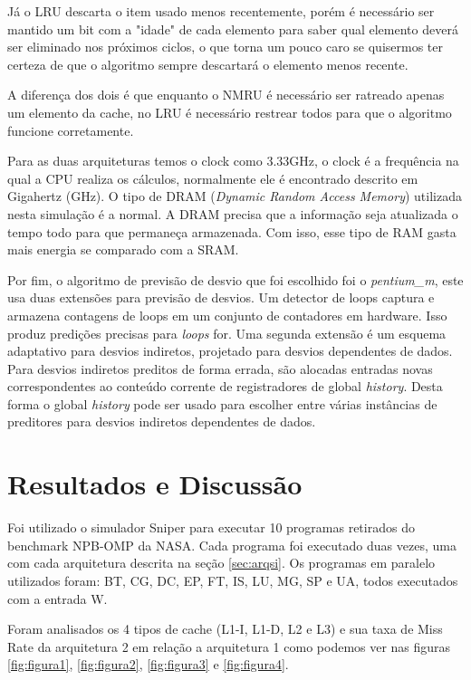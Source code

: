 \documentclass[12pt]{article}
\begin{document}
Já o LRU descarta o item usado menos recentemente, porém é necessário ser mantido um bit com a "idade" de cada elemento para saber qual elemento deverá ser eliminado nos próximos ciclos, o que torna um pouco caro se quisermos ter certeza de que o algoritmo sempre descartará o elemento menos recente.

A diferença dos dois é que enquanto o NMRU é necessário ser ratreado apenas um elemento da cache, no LRU é necessário restrear todos para que o algoritmo funcione corretamente. 

Para as duas arquiteturas temos o clock como 3.33GHz, o clock é a frequência na qual a CPU realiza os cálculos, normalmente ele é encontrado descrito em Gigahertz (GHz). O tipo de DRAM (\textit{Dynamic Random Access Memory}) utilizada nesta simulação é a normal. A DRAM precisa que a informação seja atualizada o tempo todo para que permaneça armazenada. Com isso, esse tipo de RAM gasta mais energia se comparado com a SRAM. 

Por fim, o algoritmo de previsão de desvio que foi escolhido foi o \textit{pentium\_m}, este usa duas extensões para previsão de desvios. Um detector de loops captura e armazena contagens de loops em um conjunto de contadores em hardware. Isso produz predições precisas para \textit{loops} for. Uma segunda extensão é um esquema adaptativo para desvios indiretos, projetado para desvios dependentes de dados. Para desvios indiretos preditos de forma errada, são alocadas entradas novas correspondentes ao conteúdo corrente de registradores de global \textit{history}. Desta forma o global \textit{history} pode ser usado para escolher entre várias instâncias de preditores para desvios indiretos dependentes de dados. \cite{gui}

\section{Resultados e Discussão} \label{sec:result}
Foi utilizado o simulador Sniper para executar 10 programas retirados do benchmark NPB-OMP da NASA. Cada programa foi executado duas vezes, uma com cada arquitetura descrita na seção \ref{sec:arqsi}. Os programas em paralelo utilizados foram:  BT, CG, DC, EP, FT, IS, LU, MG, SP e UA, todos executados com a entrada W.

Foram analisados os 4 tipos de cache (L1-I, L1-D, L2 e L3) e sua taxa de Miss Rate da arquitetura 2 em relação a arquitetura 1 como podemos ver nas figuras \ref{fig:figura1}, \ref{fig:figura2}, \ref{fig:figura3} e \ref{fig:figura4}. 
\end{document}
